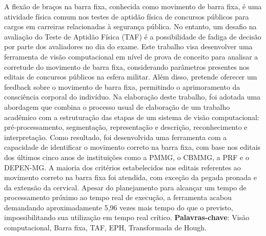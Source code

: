 \documentclass[
	12pt,			%
	openany,		%
	oneside,		%
	a4paper,		%
	english,		%
	brazil			%
	]{abntex2}
\begin{document}
\begin{resumo}
	A flexão de braços na barra fixa, conhecida como movimento de barra fixa, é uma atividade física comum nos testes de aptidão física de concursos públicos para cargos em carreiras relacionadas à segurança pública. No entanto, um desafio na avaliação do Teste de Aptidão Física (\acs{TAF}) é a possibilidade de fadiga de decisão por parte dos avaliadores no dia do exame.
	Este trabalho visa desenvolver uma ferramenta de visão computacional em nível de prova de conceito para analisar a corretude do movimento de barra fixa, considerando parâmetros presentes nos editais de concursos públicos na esfera militar. Além disso, pretende oferecer um feedback sobre o movimento de barra fixa, permitindo o aprimoramento da consciência corporal do indivíduo.
	Na elaboração deste trabalho, foi adotada uma abordagem que combina o processo usual de elaboração de um trabalho acadêmico com a estruturação das etapas de um sistema de visão computacional: pré-processamento, segmentação, representação e descrição, reconhecimento e interpretação.
	Como resultado, foi desenvolvida uma ferramenta com a capacidade de identificar o movimento correto na barra fixa, com base nos editais dos últimos cinco anos de instituições como a \ac{PMMG}, o \ac{CBMMG}, a \ac{PRF} e o \ac{DEPEN-MG}. A maioria dos critérios estabelecidos nos editais referentes ao movimento correto na barra fixa foi atendida, com exceção da pegada pronada e da extensão da cervical. Apesar do planejamento para alcançar um tempo de processamento próximo ao tempo real de execução, a ferramenta acabou demandando aproximadamente 5,96 vezes mais tempo do que o previsto, impossibilitando sua utilização em tempo real crítico. 
 \textbf{Palavras-chave}: Visão computacional, Barra fixa, TAF, EPH, Transformada de Hough.
\end{resumo}
\end{document}
